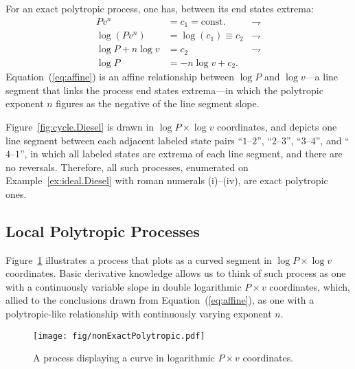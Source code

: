 \documentclass[fleqn,11pt]{SelfArx}
\begin{document}
    For an exact polytropic process, one has, between its end states extrema:%
    \begin{align}
        Pv^n & = c_1 = \text{const.}        & \rightharpoondown\\
        \log(Pv^n) & = \log(c_1) \equiv c_2 & \rightharpoondown\\
        \log P + n\log v & = c_2            & \rightharpoondown\\
        \log P & = -n\log v + c_2. \label{eq:affine}
    \end{align}
    Equation~(\ref{eq:affine}) is an affine relationship between $\log P$ and $\log v$---a  line
    segment that links the process end states extrema---in which  the  polytropic  exponent  $n$
    figures as the negative of the line segment slope.

    Figure~\ref{fig:cycle.Diesel} is drawn in $\log P \times \log v$  coordinates,  and  depicts
    one line segment between each  adjacent  labeled  state  pairs  ``$1$--$2$'',  ``$2$--$3$'',
    ``$3$--$4$'', and ``$4$--$1$'', in which  all  labeled  states  are  extrema  of  each  line
    segment,  and  there  are  no  reversals.  Therefore,  all  such  processes,  enumerated  on
    Example~\ref{ex:ideal.Diesel} with roman numerals (i)--(iv), are exact polytropic ones.

    \subsection{Local Polytropic Processes}\label{sec:local}

    Figure~\ref{fig:non.exact} illustrates a process that plots as a curved segment in  $\log  P
    \times \log v$ coordinates. Basic derivative knowledge allows us to think of such process as
    one with a continuously variable slope in double logarithmic $P\times v$ coordinates, which,
    allied  to  the  conclusions  drawn  from  Equation~(\ref{eq:affine}),   as   one   with   a
    polytropic-like relationship with continuously varying exponent $n$.

    \begin{figure}[ht]
        \centering
        \texttt{[image: fig/nonExactPolytropic.pdf]}
        \caption{A process displaying a curve in logarithmic $P\times v$ coordinates.}
        \label{fig:non.exact}
    \end{figure}
\end{document}
